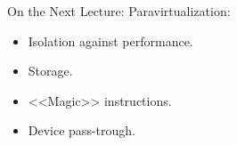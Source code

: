 \begin{frame}{On the Next Lecture:}
  Paravirtualization:
  \begin{itemize}
    \item Isolation against performance.
    \item Storage.
    \item{<<Magic>> instructions}.
    \item Device pass-trough.
  \end{itemize}
\end{frame}

\finalslide


